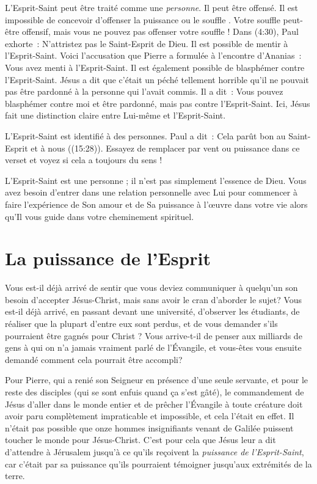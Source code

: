 L'Esprit-Saint peut être traité comme une \emph{personne}. Il peut être offensé.
 Il est impossible de concevoir d'offenser \og la puissance \fg{} ou
 \og le souffle \fg{}. Votre souffle peut-être offensif, mais vous ne pouvez
 pas offenser votre souffle ! Dans (4:30), Paul exhorte~:
 \og N'attristez pas le Saint-Esprit de Dieu. \fg{}
 Il est possible de mentir à l'Esprit-Saint. Voici l'accusation que Pierre a
 formulée à l'encontre d'Ananias~:
 \og Vous avez menti à l'Esprit-Saint. \fg{}
 Il est également possible de blasphémer contre l'Esprit-Saint.
 Jésus a dit que c'était un péché tellement horrible qu'il ne pouvait pas
 être pardonné à la personne qui l'avait commis. Il a dit~:
 \og Vous pouvez blasphémer contre moi et être pardonné, mais pas contre
 l'Esprit-Saint. \fg{}
 Ici, Jésus fait une distinction claire entre Lui-même et l'Esprit-Saint.

L'Esprit-Saint est identifié à des personnes. Paul a dit~:
 \og Cela parût bon au Saint-Esprit et à nous \fg{}
 ((15:28)).
 Essayez de remplacer par vent ou puissance dans ce verset et voyez si cela
 a toujours du sens !

L'Esprit-Saint est une personne ; il n'est pas simplement l'essence de Dieu.
 Vous avez besoin d'entrer dans une relation personnelle avec Lui pour
 commencer à faire l'expérience de Son amour et de Sa puissance à l'œuvre
 dans votre vie alors qu'Il vous guide dans votre cheminement spirituel.


\section*{La puissance de l'Esprit}

Vous est-il déjà arrivé de sentir que vous deviez communiquer à quelqu'un
son besoin d'accepter Jésus-Christ, mais sans avoir le cran d'aborder le sujet?
 Vous est-il déjà arrivé, en passant devant une université,
 d'observer les étudiants, de réaliser que la plupart d'entre eux sont perdus,
 et de vous demander s'ils pourraient être gagnés pour Christ ?
 Vous arrive-t-il de penser aux milliards de gens à qui on n'a jamais vraiment
 parlé de l'Évangile, et vous-êtes vous ensuite demandé comment cela pourrait
 être accompli?

Pour Pierre, qui a renié son Seigneur en présence d'une seule servante,
 et pour le reste des disciples (qui se sont enfuis quand ça s'est gâté),
 le commandement de Jésus d'aller dans le monde entier et de prêcher
 l'Évangile à toute créature doit avoir paru complètement impraticable et
 impossible, et cela l'était en effet.
 Il n'était pas possible que onze hommes insignifiants venant de Galilée
 puissent toucher le monde pour Jésus-Christ.
 C'est pour cela que Jésus leur a dit d'attendre à Jérusalem jusqu'à ce
 qu'ils reçoivent la \emph{puissance de l'Esprit-Saint}, car c'était par
 sa puissance qu'ils pourraient témoigner jusqu'aux extrémités de la terre.

